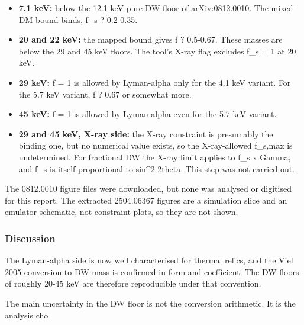 \documentclass[11pt,a4paper]{article}
\begin{document}
\begin{itemize}
  \item \textbf{7.1 keV:} below the 12.1 keV pure-DW floor of arXiv:0812.0010. The mixed-DM bound binds, f\_s ? 0.2-0.35.
  \item \textbf{20 and 22 keV:} the mapped bound gives f ? 0.5-0.67. These masses are below the 29 and 45 keV floors. The tool's X-ray flag excludes f\_s = 1 at 20 keV.
  \item \textbf{29 keV:} f = 1 is allowed by Lyman-alpha only for the 4.1 keV variant. For the 5.7 keV variant, f ? 0.67 or somewhat more.
  \item \textbf{45 keV:} f = 1 is allowed by Lyman-alpha even for the 5.7 keV variant.
  \item \textbf{29 and 45 keV, X-ray side:} the X-ray constraint is presumably the binding one, but no numerical value exists, so the X-ray-allowed f\_s,max is undetermined. For fractional DW the X-ray limit applies to f\_s x Gamma, and f\_s is itself proportional to sin\textasciicircum{}2 2theta. This step was not carried out.
\end{itemize}
The 0812.0010 figure files were downloaded, but none was analysed or digitised for this report. The extracted 2504.06367 figures are a simulation slice and an emulator schematic, not constraint plots, so they are not shown.

\subsubsection*{Discussion}
The Lyman-alpha side is now well characterised for thermal relics, and the Viel 2005 conversion to DW mass is confirmed in form and coefficient. The DW floors of roughly 20-45 keV are therefore reproducible under that convention.

The main uncertainty in the DW floor is not the conversion arithmetic. It is the analysis cho
\end{document}
